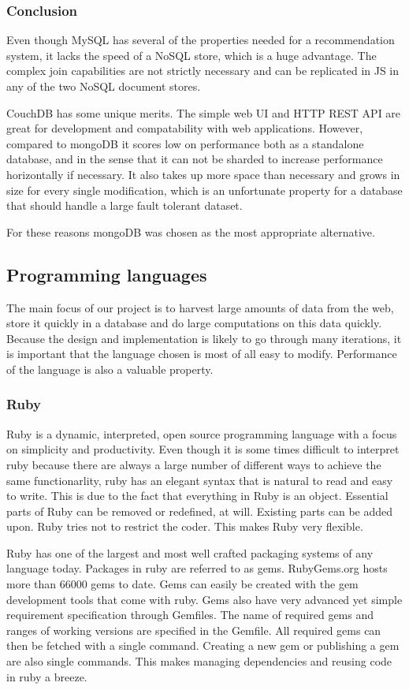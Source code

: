 \subsubsection{Conclusion}
Even though MySQL has several of the properties needed for a recommendation system, it lacks the speed of a NoSQL store, which is a huge advantage. The complex join capabilities are not strictly necessary and can be replicated in JS in any of the two NoSQL document stores.

CouchDB has some unique merits. The simple web UI and HTTP REST API are great for development and compatability with web applications. However, compared to mongoDB it scores low on performance both as a standalone database, and in the sense that it can not be sharded to increase performance horizontally if necessary. It also takes up more space than necessary and grows in size for every single modification, which is an unfortunate property for a database that should handle a large fault tolerant dataset.

For these reasons mongoDB was chosen as the most appropriate alternative.


\subsection{Programming languages}
The main focus of our project is to harvest large amounts of data from the web, store it quickly in a database and do large computations on this data quickly. Because the design and implementation is likely to go through many iterations, it is important that the language chosen is most of all easy to modify. Performance of the language is also a valuable property.

\subsubsection{Ruby}
Ruby is a dynamic, interpreted, open source programming language with a focus on simplicity and productivity. Even though it is some times difficult to interpret ruby because there are always a large number of different ways to achieve the same functionarlity, ruby has an elegant syntax that is natural to read and easy to write. This is due to the fact that everything in Ruby is an object. Essential parts of Ruby can be removed or redefined, at will. Existing parts can be added upon. Ruby tries not to restrict the coder. This makes Ruby very flexible. \cite{ruby-about}

Ruby has one of the largest and most well crafted packaging systems of any language today. Packages in ruby are referred to as gems. RubyGems.org hosts more than 66000 gems to date. Gems can easily be created with the gem development tools that come with ruby. Gems also have very advanced yet simple requirement specification through Gemfiles. The name of required gems and ranges of working versions are specified in the Gemfile. All required gems can then be fetched with a single command. Creating a new gem or publishing a gem are also single commands. This makes managing dependencies and reusing code in ruby a breeze.\cite{rubygems}

